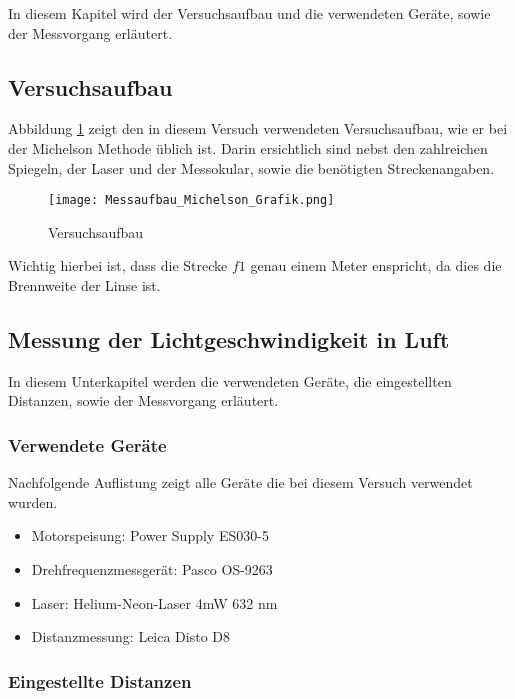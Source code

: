 In diesem Kapitel wird der Versuchsaufbau und die verwendeten Geräte, sowie der Messvorgang erläutert.

\subsection{Versuchsaufbau}

Abbildung \ref{fig:Versuchaufbau} zeigt den in diesem Versuch verwendeten Versuchsaufbau, wie er bei der Michelson Methode üblich ist. Darin ersichtlich sind nebst den zahlreichen Spiegeln, der Laser und der Messokular, sowie die benötigten Streckenangaben.

\begin{figure}[htb]
\texttt{[image: Messaufbau\_Michelson\_Grafik.png]}
\caption{Versuchsaufbau}
\label{fig:Versuchaufbau}
\end{figure}

Wichtig hierbei ist, dass die Strecke $f1$ genau einem Meter enspricht, da dies die Brennweite der Linse ist.

\subsection{Messung der Lichtgeschwindigkeit in Luft}

In diesem Unterkapitel werden die verwendeten Geräte, die eingestellten Distanzen, sowie der Messvorgang erläutert.

\subsubsection{Verwendete Geräte}

Nachfolgende Auflistung zeigt alle Geräte die bei diesem Versuch verwendet wurden.

\begin{itemize}
\item Motorspeisung: Power Supply ES030-5
\item Drehfrequenzmessgerät: Pasco OS-9263
\item Laser: Helium-Neon-Laser 4mW 632 nm
\item Distanzmessung: Leica Disto D8
\end{itemize}

\subsubsection{Eingestellte Distanzen}
\label{sec:Eingestellte Distanzen}

